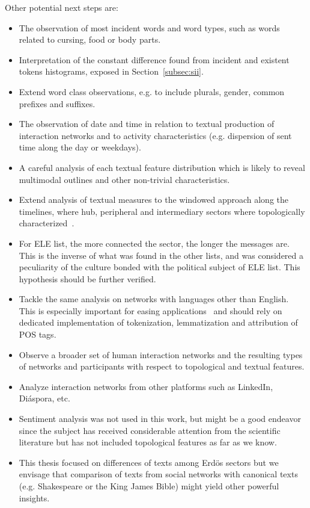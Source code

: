 Other potential next steps are:
\begin{itemize}
    \item The observation of most incident words and word types,
	    such as words related to cursing, food or body parts.
    \item Interpretation of the constant difference found from incident and existent tokens histograms,
	    exposed in Section~\ref{subsec:sii}.
    \item Extend word class observations, e.g. to include plurals, gender, common prefixes and suffixes.
    \item The observation of date and time in relation to textual production of interaction networks and
	    to activity characteristics (e.g. dispersion of sent time along the day or weekdays).
    \item A careful analysis of each textual feature distribution which is likely to reveal multimodal outlines and other non-trivial characteristics.
    \item Extend analysis of textual measures to the windowed approach along the timelines, where hub, peripheral and intermediary sectors where topologically characterized~\cite{evoSN}.
    \item For ELE list, the more connected the sector, the longer the messages are.
	    This is the inverse of what was found in the other lists,
	    and was considered a peculiarity of the culture bonded with the political subject of ELE list.
	    This hypothesis should be further verified.
    \item Tackle the same analysis on networks with languages other than English.
	    This is especially important for easing applications~\cite{ensaio}
	    and should rely on dedicated implementation of 
	    tokenization, lemmatization and attribution of POS tags.
    \item Observe a broader set of human interaction networks and the resulting types
	    of networks and participants with respect to topological and textual features.
    \item Analyze interaction networks from other platforms such as LinkedIn, Diáspora, etc.
    \item Sentiment analysis was not used in this work, but might be a good endeavor since the subject has received considerable attention from the scientific literature but has not included topological features as far as we know.
    \item This thesis focused on differences of texts among Erd\"os sectors but we envisage that comparison of texts from social networks with canonical texts (e.g. Shakespeare or the King James Bible) might yield other powerful insights.
\end{itemize}
 
